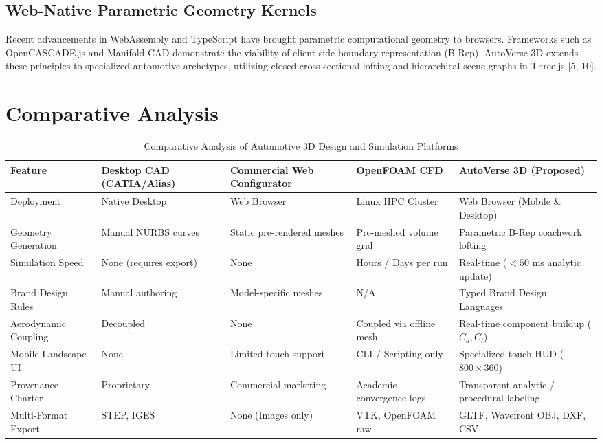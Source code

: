 \documentclass[12pt,a4paper]{report}
\begin{document}
\subsection{Web-Native Parametric Geometry Kernels}
Recent advancements in WebAssembly and TypeScript have brought parametric computational geometry to browsers. Frameworks such as OpenCASCADE.js and Manifold CAD demonstrate the viability of client-side boundary representation (B-Rep). AutoVerse 3D extends these principles to specialized automotive archetypes, utilizing closed cross-sectional lofting and hierarchical scene graphs in Three.js [5, 10].

\section{Comparative Analysis}

\begin{table}[H]
\centering
\small
\caption{Comparative Analysis of Automotive 3D Design and Simulation Platforms}
\label{tab:lit_comparison}
\renewcommand{\arraystretch}{1.3}
\begin{tabularx}{\textwidth}{|>{\raggedright\arraybackslash}p{2.6cm}|>{\raggedright\arraybackslash}X|>{\raggedright\arraybackslash}X|>{\raggedright\arraybackslash}X|>{\raggedright\arraybackslash}X|}
\hline
\textbf{Feature} & \textbf{Desktop CAD (CATIA/Alias)} & \textbf{Commercial Web Configurator} & \textbf{OpenFOAM CFD} & \textbf{AutoVerse 3D (Proposed)} \\
\hline
Deployment & Native Desktop & Web Browser & Linux HPC Cluster & Web Browser (Mobile \& Desktop) \\
\hline
Geometry Generation & Manual NURBS curves & Static pre-rendered meshes & Pre-meshed volume grid & Parametric B-Rep coachwork lofting \\
\hline
Simulation Speed & None (requires export) & None & Hours / Days per run & Real-time ($< 50$ ms analytic update) \\
\hline
Brand Design Rules & Manual authoring & Model-specific meshes & N/A & 24 Typed Brand Design Languages \\
\hline
Aerodynamic Coupling & Decoupled & None & Coupled via offline mesh & Real-time component buildup ($C_d, C_l$) \\
\hline
Mobile Landscape UI & None & Limited touch support & CLI / Scripting only & Specialized touch HUD ($800\times360$) \\
\hline
Provenance Charter & Proprietary & Commercial marketing & Academic convergence logs & Transparent analytic / procedural labeling \\
\hline
Multi-Format Export & STEP, IGES & None (Images only) & VTK, OpenFOAM raw & GLTF, Wavefront OBJ, DXF, CSV \\
\hline
\end{tabularx}
\end{table}
\end{document}

